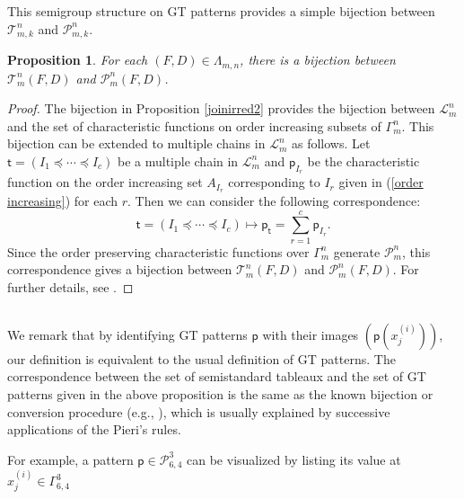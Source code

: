 \documentclass[11pt]{amsart}
\numberwithin{equation}{subsection}
\newtheorem{proposition}[theorem]{Proposition}
\begin{document}
\smallskip

This semigroup structure on GT patterns provides a simple
bijection between $\mathcal{T}_{m,k}^{n}$ and $\mathcal{P}_{m,k}^{n}$.

\begin{proposition} \label{bijection YT-GT}
For each $(F,D) \in \Lambda_{m,n}$, there is a bijection
between $\mathcal{T}_{m}^{n}(F,D)$ and $\mathcal{P}_{m}^{n}(F,D)$.
\end{proposition}

\begin{proof}
The bijection in Proposition \ref{joinirred2} provides the bijection between 
$\mathcal{L}_{m}^{n}$ and the set of characteristic functions on order
increasing subsets of $\Gamma _{m}^{n}$. This bijection can be extended to 
multiple chains in $\mathcal{L}_{m}^{n}$ as follows. Let 
$\mathsf{t}=(I_{1}\preceq \cdots \preceq I_{c})$ be a multiple chain in 
$\mathcal{L}_{m}^{n}$ and $\mathsf{p}_{I_{r}}$ be the characteristic 
function on the order increasing set $A_{I_{r}}$ corresponding to $I_{r}$ 
given in (\ref{order increasing}) for each $r$. Then we can consider the 
following correspondence:
\begin{equation}
\mathsf{t}=(I_{1}\preceq \cdots \preceq I_{c})\mapsto \mathsf{p}_{\mathsf{t}}
= \sum\limits_{r=1}^{c}\mathsf{p}_{I_{r}}.  \label{procedure2}
\end{equation}
Since the order preserving characteristic functions over $\Gamma _{m}^{n}$
generate $\mathcal{P}_{m}^{n}$, this correspondence gives a bijection
between $\mathcal{T}_{m}^{n}(F,D)$ and $\mathcal{P}_{m}^{n}(F,D)$. For
further details, see \cite{How05, Ki08}.
\end{proof}


\subsection{}

We remark that by identifying GT patterns $\mathsf{p}$ with their images 
$(\mathsf{p}(x_{j}^{(i)}))$, our definition is equivalent to the usual definition of 
GT patterns. The correspondence between the set of semistandard tableaux 
and the set of GT patterns given in the above proposition is the same as 
the known bijection or conversion procedure (e.g., \cite[\S 8.1.2]{GW09}), which 
is usually explained by successive applications of the Pieri's rules.

\medskip

For example, a pattern $\mathsf{p} \in \mathcal{P}_{6,4}^{3}$ can be
visualized by listing its value at $x_j^{(i)} \in \Gamma_{6,4}^3$
\end{document}
